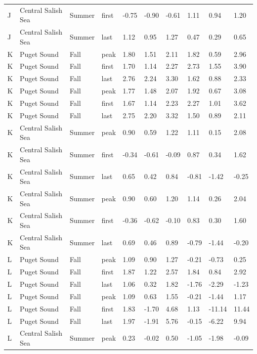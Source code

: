 \documentclass{article}
\begin{document}
\begin{table}[ht]
\begin{tabular}{|p{}|p{}|p{}|p{}|p{}p{}p{}|p{}p{}p{}|}
  J & Central Salish Sea & Summer & first & -0.75 & -0.90 & -0.61 & 1.11 & 0.94 & 1.20 \\ 
  J & Central Salish Sea & Summer & last & 1.12 & 0.95 & 1.27 & 0.47 & 0.29 & 0.65 \\ 
   \hline
K & Puget Sound & Fall & peak & 1.80 & 1.51 & 2.11 & 1.82 & 0.59 & 2.96 \\ 
  K & Puget Sound & Fall & first & 1.70 & 1.14 & 2.27 & 2.73 & 1.55 & 3.90 \\ 
  K & Puget Sound & Fall & last & 2.76 & 2.24 & 3.30 & 1.62 & 0.88 & 2.33 \\ 
  K & Puget Sound & Fall & peak & 1.77 & 1.48 & 2.07 & 1.92 & 0.67 & 3.08 \\ 
  K & Puget Sound & Fall & first & 1.67 & 1.14 & 2.23 & 2.27 & 1.01 & 3.62 \\ 
  K & Puget Sound & Fall & last & 2.75 & 2.20 & 3.32 & 1.50 & 0.89 & 2.11 \\ 
   \hline
K & Central Salish Sea & Summer & peak & 0.90 & 0.59 & 1.22 & 1.11 & 0.15 & 2.08 \\ 
  K & Central Salish Sea & Summer & first & -0.34 & -0.61 & -0.09 & 0.87 & 0.34 & 1.62 \\ 
  K & Central Salish Sea & Summer & last & 0.65 & 0.42 & 0.84 & -0.81 & -1.42 & -0.25 \\ 
  K & Central Salish Sea & Summer & peak & 0.90 & 0.60 & 1.20 & 1.14 & 0.26 & 2.04 \\ 
  K & Central Salish Sea & Summer & first & -0.36 & -0.62 & -0.10 & 0.83 & 0.30 & 1.60 \\ 
  K & Central Salish Sea & Summer & last & 0.69 & 0.46 & 0.89 & -0.79 & -1.44 & -0.20 \\ 
   \hline
L & Puget Sound & Fall & peak & 1.09 & 0.90 & 1.27 & -0.21 & -0.73 & 0.25 \\ 
  L & Puget Sound & Fall & first & 1.87 & 1.22 & 2.57 & 1.84 & 0.84 & 2.92 \\ 
  L & Puget Sound & Fall & last & 1.06 & 0.32 & 1.82 & -1.76 & -2.29 & -1.23 \\ 
  L & Puget Sound & Fall & peak & 1.09 & 0.63 & 1.55 & -0.21 & -1.44 & 1.17 \\ 
  L & Puget Sound & Fall & first & 1.83 & -1.70 & 4.68 & 1.13 & -11.14 & 11.44 \\ 
  L & Puget Sound & Fall & last & 1.97 & -1.91 & 5.76 & -0.15 & -6.22 & 9.94 \\ 
   \hline
L & Central Salish Sea & Summer & peak & 0.23 & -0.02 & 0.50 & -1.05 & -1.98 & -0.09 \\ 

\end{tabular}
\end{table}
\end{document}
